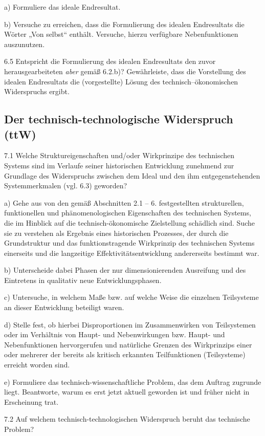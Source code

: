 \documentclass[12pt,a4paper]{article}
\begin{document}
a) Formuliere das ideale Endresultat.

b) Versuche zu erreichen, dass die Formulierung des idealen Endresultats die
Wörter „Von selbst“ enthält. Versuche, hierzu verfügbare Nebenfunktionen
auszunutzen.

6.5 Entspricht die Formulierung des idealen Endresultats den zuvor
herausgearbeiteten \emph{aber} gemäß 6.2.b)?  Gewährleiste, dass die
Vorstellung des idealen Endresultats die (vorgestellte) Lösung des
technisch–ökonomischen Widerspruchs ergibt.

\subsection{Der technisch-technologische Widerspruch (ttW)}

7.1 Welche Struktureigenschaften und/oder Wirkprinzipe des technischen Systems
sind im Verlaufe seiner historischen Entwicklung zunehmend zur Grundlage des
Widerspruchs zwischen dem Ideal und den ihm entgegenstehenden Systemmerkmalen
(vgl. 6.3) geworden?

a) Gehe aus von den gemäß Abschnitten 2.1 – 6. festgestellten strukturellen,
funktionellen und phänomenologischen Eigenschaften des technischen Systems, die
im Hinblick auf die technisch-ökonomische Zielstellung schädlich sind. Suche
sie zu verstehen als Ergebnis eines historischen Prozesses, der durch die
Grundstruktur und das funktionstragende Wirkprinzip des technischen Systems
einerseits und die langzeitige Effektivitätsentwicklung andererseits bestimmt
war.

b) Unterscheide dabei Phasen der nur dimensionierenden Ausreifung und des
Eintretens in qualitativ neue Entwicklungsphasen.

c) Untersuche, in welchem Maße bzw. auf welche Weise die einzelnen Teilsysteme
an dieser Entwicklung beteiligt waren.

d) Stelle fest, ob hierbei Disproportionen im Zusammenwirken von Teilsystemen
oder im Verhältnis von Haupt- und Nebenwirkungen bzw. Haupt- und
Nebenfunktionen hervorgerufen und natürliche Grenzen des Wirkprinzips einer
oder mehrerer der bereits als kritisch erkannten Teilfunktionen (Teilsysteme)
erreicht worden sind.

e) Formuliere das technisch-wissenschaftliche Problem, das dem Auftrag zugrunde
liegt. Beantworte, warum es erst jetzt aktuell geworden ist und früher nicht in
Erscheinung trat.

7.2 Auf welchem technisch-technologischen Widerspruch beruht das technische
Problem?
\end{document}

